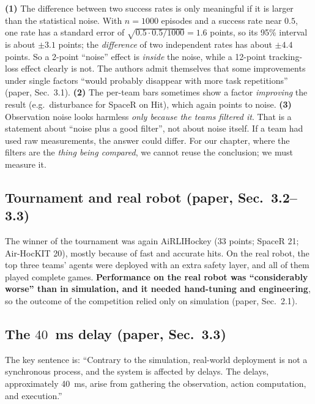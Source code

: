 \documentclass[11pt,a4paper]{article}
\begin{document}
\begin{warn}
\textbf{(1)} The difference between two success rates is only meaningful if it is larger than the
statistical noise. With $n=1000$ episodes and a success rate near $0.5$, one rate has a standard
error of $\sqrt{0.5\cdot0.5/1000}=1.6$ points, so its 95\% interval is about $\pm3.1$ points; the
\emph{difference} of two independent rates has about $\pm4.4$ points. So a 2-point ``noise'' effect
is \emph{inside} the noise, while a 12-point tracking-loss effect clearly is not. The authors
admit themselves that some improvements under single factors ``would probably disappear with more
task repetitions'' (paper, Sec.~3.1). \textbf{(2)} The per-team bars sometimes show a factor
\emph{improving} the result (e.g.\ disturbance for SpaceR on Hit), which again points to noise.
\textbf{(3)} Observation noise looks harmless \emph{only because the teams filtered it}. That is a
statement about ``noise plus a good filter'', not about noise itself. If a team had used raw
measurements, the answer could differ. For our chapter, where the filters are the \emph{thing
being compared}, we cannot reuse the conclusion; we must measure it.
\end{warn}

\subsection{Tournament and real robot (paper, Sec.~3.2--3.3)}
The winner of the tournament was again AiRLIHockey (33 points; SpaceR 21; Air-HocKIT 20), mostly
because of fast and accurate hits. On the real robot, the top three teams' agents were deployed
with an extra safety layer, and all of them played complete games. \textbf{Performance on the real
robot was ``considerably worse'' than in simulation, and it needed hand-tuning and
engineering}, so the outcome of the competition relied only on simulation (paper, Sec.~2.1).

\subsection{The $40$~ms delay (paper, Sec.~3.3)}
\label{sec:delay}
The key sentence is: ``Contrary to the simulation, real-world deployment is not a synchronous
process, and the system is affected by delays. The delays, approximately 40~ms, arise from
gathering the observation, action computation, and execution.''
\end{document}
